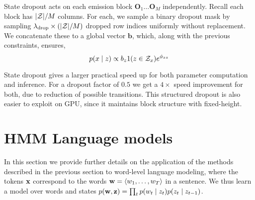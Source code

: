 \documentclass[11pt,a4paper]{article}
\begin{document}

State dropout acts on each emission block $\mathbf{O}_1 \ldots \mathbf{O}_M$ independently.
Recall each block has $|{\cal Z}| / M$ columns.
For each, we sample a binary dropout mask by sampling
$ \lambda_{\text{drop}} \times(|{\cal Z}| / M)$ dropped row indices uniformly without replacement.
We concatenate these to a global vector $\mathbf{b}$, which, along with the previous constraints,  ensures,
\begin{equation}
\label{eqn:state_dropout}
p(x \mid z) \propto b_{z}1(z \in \mathcal{Z}_x)e^{\phi_{xz}}
\end{equation}

State dropout gives a larger practical speed up for both parameter computation and inference.
For a dropout factor of $0.5$ we get a $4\times$ speed improvement for both,
due to reduction of possible transitions.
This structured dropout is also easier to exploit on GPU,
since it maintains block structure with fixed-height.










\section{HMM Language models}
\label{sec:experiments}
In this section we provide further details on the application
of the methods described in the previous section
to word-level language modeling,
where the tokens $\mathbf{x}$ correspond to the words
$\mathbf{w} = \langle w_1,\ldots,w_T \rangle$ in a sentence.
We thus learn a model over words and states
$p(\mathbf{w},\mathbf{z}) = \prod_t p(w_t\mid z_t)p(z_t \mid z_{t-1})$.
\end{document}
